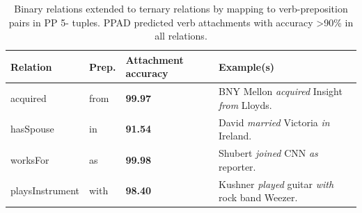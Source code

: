 \begin{table}[ht]
%
\centering
%

\begin{tabular}{lp{1.4cm}lp{5.8cm}}
\hline
{\bf  Relation} &  {\bf  Prep. } & {\bf  Attachment accuracy}   &{\bf Example(s) } \\
\hline
acquired
& from  & \textbf{99.97}  
& BNY Mellon	\textit{acquired}	Insight 	\textit{from}	Lloyds.\\
\hline
hasSpouse & in  & \textbf{91.54} & David \textit{married}	Victoria	\textit{in}	Ireland.  \\
\hline
	worksFor  & as & \textbf{99.98} & 
Shubert	\textit{joined}	CNN	\textit{as}	reporter. \\
		\hline
playsInstrument   & with & \textbf{98.40}  & Kushner	\textit{played}	 guitar	\textit{with}	rock band Weezer. \\
\hline
\end{tabular}
  \caption{Binary relations extended to ternary relations by mapping to verb-preposition pairs in PP 5-
tuples. PPAD predicted verb attachments with accuracy \textgreater 90\% in all relations.}
   \label{tab:tenary}
  \end{table}
      
